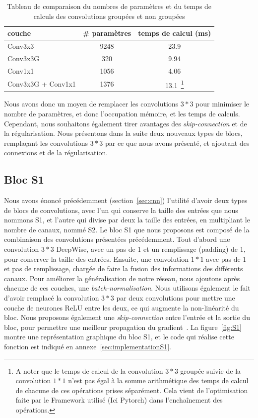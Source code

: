 \begin{table}[!htb]
\centering
\begin{tabular}{|l|c|c|}
\hline
couche & \# paramètres & temps de calcul (ms) \\
\hline
\hline
Conv3x3 & 9248 & 23.9 \\
\hline
Conv3x3G & 320 & 9.94\\
\hline
Conv1x1 & 1056 & 4.06\\
\hline
Conv3x3G + Conv1x1 & 1376 & 13.1~\footnote{A noter que le temps de calcul de la convolution $3*3$ groupée suivie de la convolution $1*1$ n'est pas égal à la somme arithmétique des temps de calcul de chacune de ces opérations prises séparément. Cela vient de l'optimisation faite par le Framework utilisé (Ici Pytorch) dans l'enchaînement des opérations.} \\
\hline
\end{tabular}
\caption{Tableau de comparaison du nombres de paramètres et du temps de calculs des convolutions groupées et non groupées}
\label{tab:convG}
\end{table}

Nous avons donc un moyen de remplacer les convolutions $3*3$ pour minimiser le nombre de paramètres, et donc l'occupation mémoire, et les temps de calculs.
Cependant, nous souhaitons également tirer avantages des \textit{skip-connection} et de la régularisation.
Nous présentons dans la suite deux nouveaux types de blocs, remplaçant les convolutions $3*3$ par ce que nous avons présenté, et ajoutant des connexions et de la régularisation.


\subsection{Bloc S1}
\label{sec:S1}


Nous avons énoncé précédemment (section~\ref{sec:cnn}) l'utilité d'avoir deux types de blocs de convolutions, avec l’un qui conserve la taille des entrées que nous nommons S1, et l’autre qui divise par deux la taille des entrées, en multipliant le nombre de canaux, nommé S2.
Le bloc S1 que nous proposons est composé de la combinaison des convolutions présentées précédemment.
Tout d'abord une convolution $3*3$ DeepWise, avec un pas de 1 et un remplissage (padding) de 1, pour conserver la taille des entrées.
Ensuite, une convolution $1*1$ avec pas de 1 et pas de remplissage, chargée de faire la fusion des informations des différents canaux.
Pour améliorer la généralisation de notre réseau, nous ajoutons après chacune de ces couches, une \textit{batch-normalisation}.
Nous utilisons également le fait d'avoir remplacé la convolution $3*3$ par deux convolutions pour mettre une couche de neurones ReLU entre les deux, ce qui augmente la non-linéarité du bloc. 
Nous proposons également une \textit{skip-connection} entre l'entrée et la sortie du bloc, pour permettre une meilleur propagation du gradient~\cite{he2015delving}.
La figure~\ref{fig:S1} montre une représentation graphique du bloc S1, et le code qui réalise cette fonction est indiqué en annexe~\ref{sec:implementationS1}.



